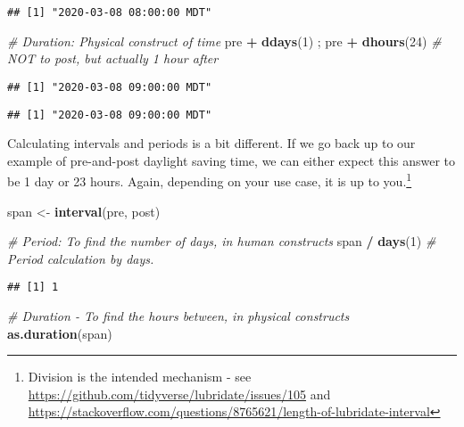 \documentclass[
]{book}
\newenvironment{Shaded}{\begin{snugshade}}{\end{snugshade}}
\newcommand{\CommentTok}[1]{\textcolor[rgb]{0.56,0.35,0.01}{\textit{#1}}}
\newcommand{\DecValTok}[1]{\textcolor[rgb]{0.00,0.00,0.81}{#1}}
\newcommand{\KeywordTok}[1]{\textcolor[rgb]{0.13,0.29,0.53}{\textbf{#1}}}
\newcommand{\NormalTok}[1]{#1}
\newcommand{\OperatorTok}[1]{\textcolor[rgb]{0.81,0.36,0.00}{\textbf{#1}}}
\newcommand{\StringTok}[1]{\textcolor[rgb]{0.31,0.60,0.02}{#1}}
\begin{document}
\begin{verbatim}
## [1] "2020-03-08 08:00:00 MDT"
\end{verbatim}

\begin{Shaded}
\begin{Highlighting}[]
\CommentTok{# Duration: Physical construct of time}
\NormalTok{pre }\OperatorTok{+}\StringTok{ }\KeywordTok{ddays}\NormalTok{(}\DecValTok{1}\NormalTok{) ; pre }\OperatorTok{+}\StringTok{ }\KeywordTok{dhours}\NormalTok{(}\DecValTok{24}\NormalTok{) }\CommentTok{# NOT to post, but actually 1 hour after}
\end{Highlighting}
\end{Shaded}

\begin{verbatim}
## [1] "2020-03-08 09:00:00 MDT"
\end{verbatim}

\begin{verbatim}
## [1] "2020-03-08 09:00:00 MDT"
\end{verbatim}

Calculating intervals and periods is a bit different. If we go back up to our example of pre-and-post daylight saving time, we can either expect this answer to be 1 day or 23 hours. Again, depending on your use case, it is up to you.\footnote{Division is the intended mechanism - see \url{https://github.com/tidyverse/lubridate/issues/105} and \url{https://stackoverflow.com/questions/8765621/length-of-lubridate-interval}}

\begin{Shaded}
\begin{Highlighting}[]
\NormalTok{span <-}\StringTok{ }\KeywordTok{interval}\NormalTok{(pre, post)}

\CommentTok{# Period: To find the number of days, in human constructs}
\NormalTok{span }\OperatorTok{/}\StringTok{ }\KeywordTok{days}\NormalTok{(}\DecValTok{1}\NormalTok{) }\CommentTok{# Period calculation by days. }
\end{Highlighting}
\end{Shaded}

\begin{verbatim}
## [1] 1
\end{verbatim}

\begin{Shaded}
\begin{Highlighting}[]
\CommentTok{# Duration - To find the hours between, in physical constructs}
\KeywordTok{as.duration}\NormalTok{(span)}
\end{Highlighting}
\end{Shaded}
\end{document}
